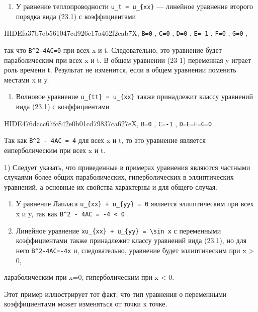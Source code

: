 \documentclass[
  ukrainian,
]{article}
\providecommand{\tightlist}{%
  \setlength{\itemsep}{0pt}\setlength{\parskip}{0pt}}
\begin{document}
\begin{enumerate}
\def\labelenumi{\arabic{enumi}.}
\tightlist
\item
  У равнение теплопроводности \texttt{u\_t\ =\ u\_\{xx\}} --- линейное
  уравнение второго порядка вида (23.1) с коэффициентами
\end{enumerate}

HIDEfa37b7eb561047cd926e17a462f2eab7X, \texttt{B=0} , \texttt{C=0} ,
\texttt{D=0} , \texttt{E=-1} , \texttt{F=0} , \texttt{G=0} ,

так что \texttt{B\^{}2-4AC=0} при всех x и t. Следовательно, это
уравнение будет параболическим при всех x и t. В общем уравнении (23 1)
переменная y играет роль времени t. Результат не изменится, если в общем
уравнении поменять местами x и y.

\begin{enumerate}
\def\labelenumi{\arabic{enumi}.}
\setcounter{enumi}{1}
\tightlist
\item
  Волновое уравнение \texttt{u\_\{tt\}\ =\ u\_\{xx\}} также принадлежит
  классу уравнений вида (23.1) с коэффициентами
\end{enumerate}

HIDE476dccc67fc842e0b01cd79837ca627eX, \texttt{B=0} , \texttt{C=-1} ,
\texttt{D=E=F=G=0} .

Так как \texttt{B\^{}2\ -\ 4AC\ =\ 4} для всех x и t, то это уравнение
является еиперболическим при всех x и t.

1) Следует указать, что приведенные в примерах уравнения являются
частными случаями более общих параболических, гиперболических в
эллиптических уравнений, а основные их свойства характерны и для общего
случая.

\begin{enumerate}
\def\labelenumi{\arabic{enumi}.}
\setcounter{enumi}{2}
\item
  У равнение Лапласа \texttt{u\_\{xx\}\ +\ u\_\{yy\}\ =\ 0} является
  эллиптическим при всех x и y, так как
  \texttt{B\^{}2\ -\ 4AC\ =\ -4\ \textless{}\ 0} .
\item
  Линейное уравнение
  \texttt{xu\_\{xx\}\ +\ u\_\{yy\}\ =\ \textbackslash{}sin\ x} с
  переменными коэффициентами также принадлежит классу уравнений вида
  (23.1), но для него \texttt{B\^{}2-4AC=-4x} и, следовательно,
  уравнение будет эллиптическим при x \textgreater{} 0,
\end{enumerate}

лараболическим при x=0, гиперболическим при x \textless{} 0.

Этот пример иллюстрирует тот факт, что тип уравнения о переменными
коэффициентами может изменяться от точки к точке.
\end{document}
